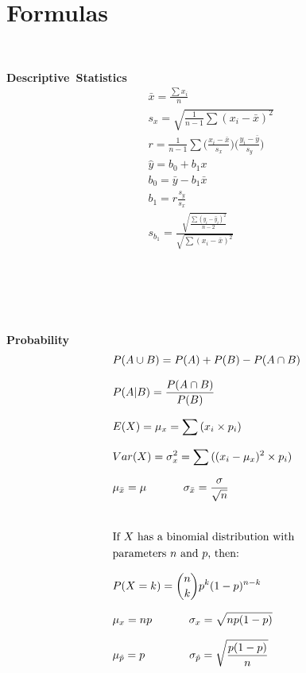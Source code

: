 
\section{Formulas}
\label{formulas}

\ \\[0mm]

\noindent%
\begin{minipage}[l]{0.32\textwidth}
\noindent%
\textbf{Descriptive~Statistics}
\begin{align*}
&\bar{x} =\frac{\sum{x_i}}{n} \\[3.5mm]
&s_x = \sqrt{\frac{1}{n-1}\sum{(x_i-\bar{x})^2}} \\[3.5mm]
&r = \frac{1}{n-1}
    \sum{\Big(\frac{x_i-\bar{x}}{s_x}\Big)
    \Big(\frac{y_i-\bar{y}}{s_y}\Big)} \\[3.5mm]
&\hat{y} = b_0+b_1x \\[3.5mm]
&b_0 = \bar{y}-b_1\bar{x} \\[3.5mm]
&b_1 = r\frac{s_y}{s_x} \\[3.5mm]
&s_{b_1}
    = \frac{\sqrt{\frac{\sum{(y_i-\hat{y}_i)^2}}{n-2}}}
        {\sqrt{\sum{(x_i-\bar{x})^2}}}
\end{align*}
\ \vspace{11mm}

\ 
\end{minipage}
\begin{minipage}[l]{0.13\textwidth}
\ 
\end{minipage}
\begin{minipage}[l]{0.35\textwidth}
\noindent%
\textbf{Probability}
\begin{align*}
&P(A \cup B) = P(A) + P(B) - P(A\cap B) \\[2.5mm]
&P(A | B) = \frac{P(A \cap B)}{P(B)} \\[2.5mm]
&E(X)=\mu_x=\sum{(x_i\times p_i)} \\[2.5mm]
&Var(X) = \sigma_x^2=\sum{((x_i-\mu_x)^2\times p_i)} \\[2.5mm]
&\mu_{\bar{x}}
    = \mu \qquad \quad
        \ \sigma_{\bar{x}} = \frac{\sigma}{\sqrt{n}} \\[8mm]
&\text{If $X$ has a binomial distribution with} \\
&\text{parameters $n$ and $p$, then:} \\[2.5mm]
&P(X=k)={n\choose k} p^k(1-p)^{n-k} \\[2.5mm]
&\mu_x=np \qquad \quad  \ \sigma_x=\sqrt{np(1-p)} \\[2.5mm]
&\mu_{\hat{p}}
    = p\qquad \qquad
        \small{\sigma_{\hat{p}}=\sqrt{\frac{p(1-p)}{n}}}
\end{align*}
\end{minipage} \\[10mm]

